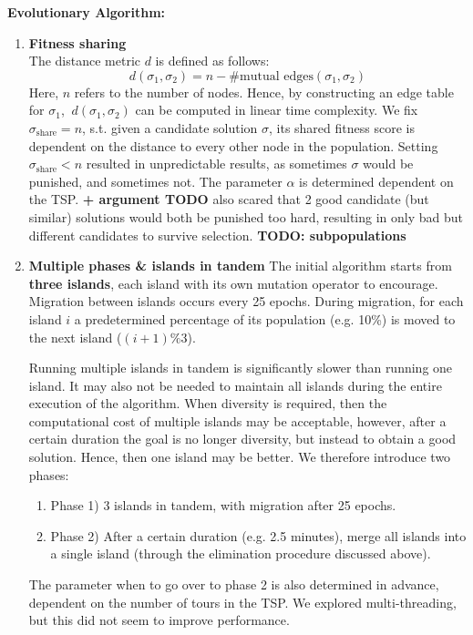 \documentclass[a4paper,10pt]{article}
\begin{document}
	\textbf{Evolutionary Algorithm:}
	\begin{enumerate}
		\item \textbf{Fitness sharing} \\
		The distance metric $d$ is defined as follows: 
		$$d(\sigma_1, \sigma_2) = n - \# \text{mutual edges}(\sigma_1, \sigma_2)$$
		Here, $n$ refers to the number of nodes. Hence, by constructing an edge table for $\sigma_1$, $~d(\sigma_1, \sigma_2)$ can be computed in linear time complexity.
		We fix $\sigma_{\text{share}} = n$, s.t. given a candidate solution $\sigma$, its shared fitness score is dependent on the distance to every other node in the population. Setting $\sigma_{\text{share}} < n$ resulted in unpredictable results, as sometimes $\sigma$ would be punished, and sometimes not. The parameter $\alpha$ is determined dependent on the TSP.
		\textbf{+ argument TODO } also scared that 2 good candidate (but similar) solutions would both be punished too hard, resulting in only bad but different candidates to survive selection.
		\textbf{TODO: subpopulations}
		
		\item \textbf{Multiple phases \& islands in tandem}
		The initial algorithm starts from \textbf{three islands}, each island with its own mutation operator to encourage. Migration between islands occurs every 25 epochs. During migration, for each island $i$ a predetermined percentage of its population (e.g. 10\%) is moved to the next island ($(i+1) \%3$).
		
		Running multiple islands in tandem is significantly slower than running one island. It may also not be needed to maintain all islands during the entire execution of the algorithm. When diversity is required, then the computational cost of multiple islands may be acceptable, however, after a certain duration the goal is no longer diversity, but instead to obtain a good solution. Hence, then one island may be better. We therefore introduce two phases:
		\begin{enumerate}
			\item Phase 1) 3 islands in tandem, with migration after 25 epochs.
			\item Phase 2) After a certain duration (e.g. 2.5 minutes), merge all islands into a single island (through the elimination procedure discussed above).
		\end{enumerate}
		
		The parameter when to go over to phase 2 is also determined in advance, dependent on the number of tours in the TSP.  We explored multi-threading, but this did not seem to improve performance.
		 	
	
	\end{enumerate}
	
\end{document}
